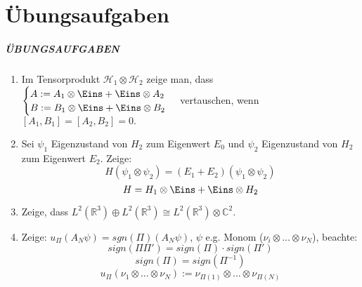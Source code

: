 \documentclass[twoside,a4paper]{scrartcl}
\renewcommand{\1}{\mathds{1}}
\begin{document}
\part{Übungsaufgaben}

\subsubsection*{ÜBUNGSAUFGABEN}
\begin{enumerate}
 \item Im Tensorprodukt $\mathcal H_1 \otimes \mathcal H_2$ zeige man, dass $\begin{cases}
  A:= A_1\otimes \Eins+ \Eins \otimes A_2\\
  B:= B_1\otimes \Eins+ \Eins \otimes B_2\\
\end{cases}$ vertauschen, wenn $[A_1,B_1]=[A_2,B_2]=0.$
 \item Sei $\psi_1$ Eigenzustand von $H_2$ zum Eigenwert $E_0$ und $\psi_2$ Eigenzustand von $H_2$ zum Eigenwert $E_2$.
Zeige: $$H(\psi_1 \otimes \psi_2)=(E_1+E_2)(\psi_1 \otimes \psi_2)$$
$$H=H_1\otimes \Eins+ \Eins \otimes H_2$$
 \item Zeige, dass $L^2(\mathbb R^3)\oplus L^2(\mathbb R^3)\cong L^2(\mathbb R^3)\otimes \mathbb C^2$.
 \item Zeige: $u_\Pi(A_N \psi)=sgn(\Pi)(A_N \psi)$, $\psi$ e.g. Monom ($\nu_i \otimes ... \otimes \nu_N$), beachte:
$$sign(\Pi \Pi')=sign(\Pi)\cdot sign(\Pi')$$
$$sign(\Pi )=sign(\Pi^{-1})$$
$$u_\Pi(\nu_1 \otimes ... \otimes \nu_N):=\nu_{\Pi(1)}\otimes ... \otimes \nu_{\Pi(N)}$$
\end{enumerate}
\end{document}
